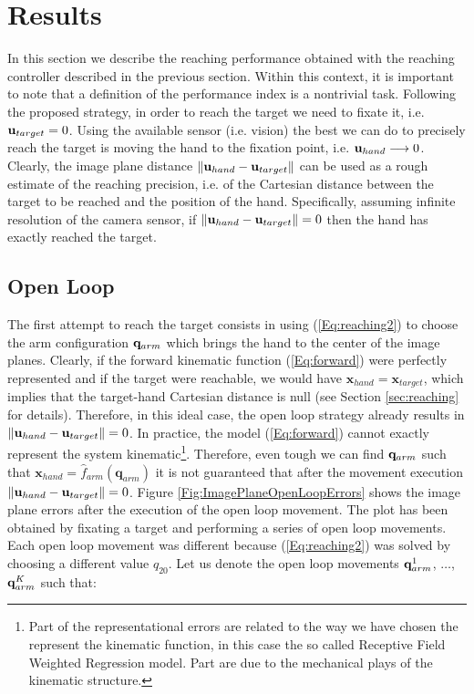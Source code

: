 \section{Results}
\label{sec:results}

In this section we describe the reaching performance obtained with 
the reaching controller described in the previous section. Within this context,
it is important to note that a definition of the performance 
index is a nontrivial task. Following the proposed strategy, in order to reach the 
target we need to fixate it, i.e. $\mathbf{u}_{target} = 0$. Using the available sensor (i.e. vision) the best we can do to precisely reach the target is moving the hand to the fixation point, i.e. $
{\mathbf{u}_{hand}} \longrightarrow 0$. Clearly, the image plane distance $\| \mathbf{u}_{hand} - \mathbf{u}_{target} \|$ can be used as a rough estimate of the reaching precision, i.e. of the Cartesian distance between the target to be reached and the position of the hand. Specifically, assuming infinite resolution of the camera sensor, if $\| \mathbf{u}_{hand} - \mathbf{u}_{target}\| = 0$ then the hand has exactly reached the target.

\subsection{Open Loop}
The first attempt to reach the target consists in using (\ref{Eq:reaching2})
to choose the arm configuration $\mathbf q_{arm}$ which brings the hand to the center 
of the image planes. Clearly, if the forward 
kinematic function (\ref{Eq:forward}) were perfectly represented and if the target were reachable, we would have $\mathbf x_{hand} =  \mathbf x_{target}$, which implies that the target-hand Cartesian distance 
 is null (see Section \ref{sec:reaching} for details). Therefore, in this ideal case, the open loop 
 strategy already results in $\| \mathbf{u}_{hand} - \mathbf{u}_{target} \| = 0$. In practice, the model 
 (\ref{Eq:forward}) cannot exactly represent the system kinematic\footnote{Part of the representational 
 errors are related to the way we have chosen the represent the kinematic function, in this case the
 so called Receptive Field Weighted Regression model. Part are due to the mechanical plays of the
 kinematic structure.}. Therefore, even tough we can find $\mathbf q_{arm}$ such that $\mathbf x_{hand}=
 \hat f_{arm}(\mathbf q_{arm})$ it is not guaranteed that after the movement execution 
 $\| \mathbf{u}_{hand} - \mathbf{u}_{target} \| = 0$. Figure \ref{Fig:ImagePlaneOpenLoopErrors}
 shows the image plane errors after the execution of the open loop movement. The plot has been obtained
 by fixating a target and performing a series of open loop movements. Each open loop
 movement was different because (\ref{Eq:reaching2}) was solved 
 by choosing a different value $q_{20}$. Let us denote the open loop movements $\mathbf q_{arm}^1$, $\dots$, 
 $\mathbf q_{arm}^K$ such that:
 
